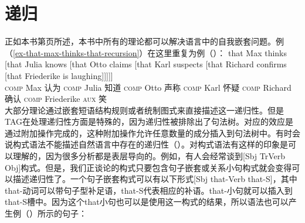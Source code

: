 \section{递归}
\label{sec-recursion}

正如本书第\pageref{ex-that-max-thinks-that-recursion}页所述，本书中所有的理论都可以解决语言中的自我嵌套问题。例（\ref{ex-that-max-thinks-that-recursion}）在这里重复为例（）：
\ea
\label{ex-that-max-thinks-that-recursion-two}
\gll that Max thinks [that Julia knows [that Otto claims [that Karl suspects [that Richard confirms [that Friederike is laughing]]]]]\\
	\textsc{comp} Max 认为 \spacebr\textsc{comp} Julia 知道 \spacebr\textsc{comp} Otto 声称 \spacebr\textsc{comp} Karl 怀疑 \spacebr\textsc{comp} Richard 确认 \spacebr\textsc{comp} Friederike \textsc{aux} 笑\\
\z
大部分理论通过嵌套短语结构规则或者统制图式来直接描述这一递归性。但是TAG\indextag 在处理递归性方面是特殊的，因为递归性被排除出了句法树。对应的效应是通过附加操作完成的，这种附加操作允许任意数量的成分插入到句法树中。有时会说构式语法\indexcxg 不能描述自然语言中存在的递归性（\egc \citealp[]{Leiss2009a}）。对构式语法有这样的印象是可以理解的，因为很多分析都是表层导向的。例如，有人会经常谈到[Sbj TrVerb Obj]构式。但是，我们正谈论的构式只要包含句子嵌套或关系小句构式就会变得可以描述递归性了。一个句子嵌套构式可以有以下形式[Sbj that-Verb that-S]，其中that-动词可以带句子型补足语，that-S代表相应的补语。that-小句就可以插入到that-S槽中。因为这个that小句也可以是使用这一构式的结果，所以语法也可以产生例（）所示的句子：
